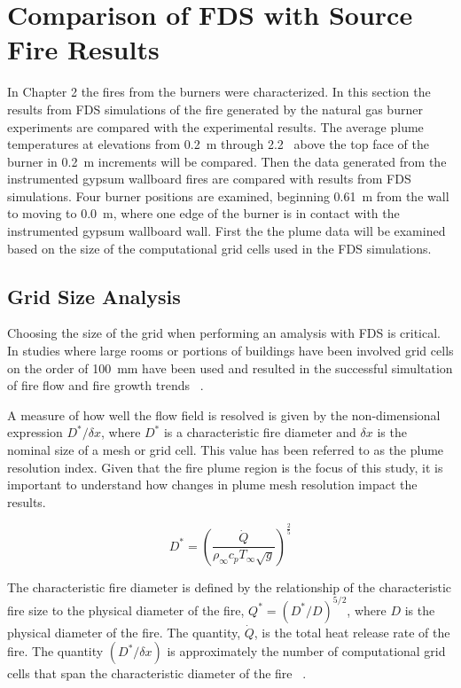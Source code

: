 \documentclass[twoside]{uocthesis}
\begin{document}
\section{Comparison of FDS with Source Fire Results}

In Chapter 2 the fires from the burners were characterized.  In this section the results from FDS simulations of the fire generated by the natural gas burner experiments are compared with the experimental results.  The average plume temperatures at elevations from 0.2~m through 2.2~ above the top face of the burner in 0.2~m increments will be compared.  Then the data generated from the instrumented gypsum wallboard fires are compared with results from FDS simulations.  Four burner positions are examined, beginning 0.61~m from the wall to moving to 0.0~m, where one edge of the burner is in contact with the instrumented gypsum wallboard wall.  First the the plume data will be examined based on the size of the computational grid cells used in the FDS simulations.  


\subsection{Grid Size Analysis}

Choosing the size of the grid when performing an amalysis with FDS is critical. In studies where large rooms or portions of buildings have been involved grid cells on the order of 100~mm have been used and resulted in the successful simultation of fire flow and fire growth trends ~\cite{Grosshandler:Station,Vettori:2000,Barowy:2012,Overholt:San_Francisco,Weinschenk:Chicago}.

 A measure of how well the flow field is resolved is given by the non-dimensional expression ${D^*}/{\delta x}$, where $D^*$ is a characteristic fire diameter and $\delta x$ is the nominal size of a mesh or grid cell. This value has been referred to as the plume resolution index. Given that the fire plume region is the focus of this study, it is important to understand how changes in plume mesh resolution impact the results.    

\begin{equation}
 D^* = \left(
     \frac{\dot Q}{\rho_\infty  c_p  T_\infty  \sqrt{g} }
     \right)^\frac{2}{5} 
 \end{equation}


The characteristic fire diameter is defined by the relationship of the characteristic fire size to the physical diameter of the fire, ${Q^*} = ({D^*}/{D})^{5/2}$, where $D$ is the physical diameter of the fire. The quantity, $\dot Q$, is the total heat release rate of the fire. The quantity $({D^*}/{\delta x})$ is approximately the number of computational grid cells that span the characteristic diameter of the fire ~\cite{FDS_Users_Guide,FDS_Validation_Guide}.  
\end{document}
